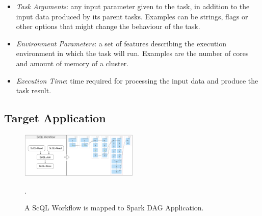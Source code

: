 \documentclass[a4paper, 10pt, conference]{ieeeconf}      %
\begin{document}
\begin{itemize}
    \item \textit{Task Arguments}: any input  parameter given to the task, in addition to the input data produced by its parent tasks. Examples can be strings, flags or other options that might change the behaviour of the task.
    \item  \textit{Environment Parameters}: %
    a set of features describing the execution environment in which the task will run. Examples are the number of cores and amount of memory of a cluster.
    \item \textit{Execution Time}: 
    time required for processing the input data and produce the task result. %
\end{itemize}





\subsection{Target Application}
\label{subsec:scql}
\begin{figure}
  \centering
  \includegraphics[width=0.5\textwidth]{sources/scql_mapping.png}
  \caption{A ScQL Workflow is mapped to Spark DAG Application.}.
\label{fig:scql-dag}
\end{figure}
\end{document}

